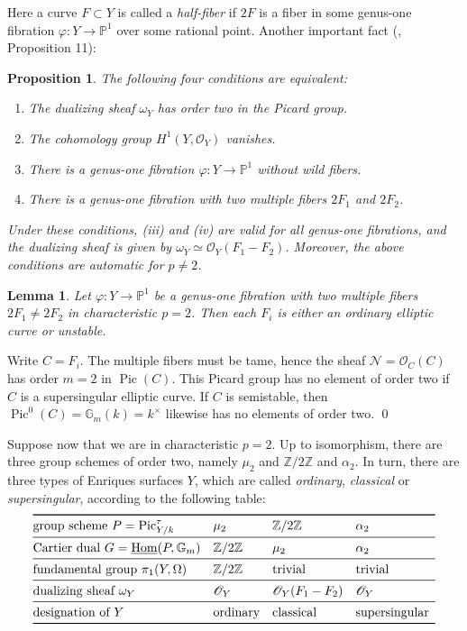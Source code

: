 \documentclass[oneside, 12pt]{amsart}
\newcommand\mylabel[1]{\label{#1}\marginpar{\vspace{-1ex}\medskip\medskip\footnotesize \tt #1}}
\renewcommand\mylabel[1]{\label{#1}}
\newtheorem{lemma}[theorem]{Lemma}
\newtheorem{proposition}[theorem]{Proposition}
\theoremstyle{definition}
\theoremstyle{remark}
\newcommand{\ZZ}{\mathbb{Z}}
\newcommand{\PP}{\mathbb{P}}
\newcommand{\GG}{\mathbb{G}}
\newcommand{\shN}{\mathscr{N}}
\renewcommand{\O}{\mathscr{O}}
\newcommand{\Pic}{\operatorname{Pic}}
\newcommand{\ra}{\rightarrow}
\newcommand{\uHom}{\underline{\operatorname{Hom}}}
\begin{document}
Here a curve $F\subset Y$ is called a \emph{half-fiber} if $2F$ is a fiber in some
genus-one fibration $\varphi:Y\ra\PP^1$ over some rational point.
Another important fact (\cite{Bombieri; Mumford 1977},  Proposition 11):

\begin{proposition}
\mylabel{omega order two}
The following four conditions are equivalent:
\begin{enumerate}
\item The dualizing sheaf $\omega_Y$ has order two in the Picard group.
\item The cohomology group $H^1(Y,\O_Y)$ vanishes.
\item There is a genus-one fibration $\varphi:Y\ra\PP^1$ without wild fibers.
\item There is a genus-one fibration with two multiple fibers $2F_1$ and $2F_2$.
\end{enumerate}
Under these conditions,   (iii) and (iv) are valid for all genus-one fibrations, and the dualizing sheaf
is given by $\omega_Y\simeq\O_Y(F_1-F_2)$. Moreover, the above conditions are automatic for $p\neq 2$.
\end{proposition}


\begin{lemma}
\mylabel{multiple for p=2}
Let $\varphi:Y\ra\PP^1$ be a genus-one fibration with two multiple fibers $2F_1\neq 2F_2$
in characteristic $p=2$. Then each $ F_i$ is either an ordinary elliptic curve  or unstable.
\end{lemma}

\proof
Write $C=F_i$.
The   multiple fibers   must be tame, hence the   sheaf $\shN=\O_C(C)$ has order $m=2$ in
 $\Pic(C)$. This Picard group has no element of order two if $C$ is a supersingular elliptic curve.
If $C$ is semistable, then $\Pic^0(C)=\GG_m(k)=k^\times $ likewise has no elements of order two. 
\qed
 
\medskip
Suppose now that we are in characteristic $p=2$. Up to isomorphism, there are three group schemes of order two,
namely $\mu_2$ and $\ZZ/2\ZZ$ and $\alpha_2$. In turn, there are three types of Enriques surfaces $Y$, which are called
\emph{ordinary}, \emph{classical} or \emph{supersingular}, according to the following table:
$$
\begin{array}[c]{@{}lll l}
\toprule	
\text{\rm group scheme $P=\Pic^\tau_{Y/k}$}		& \mu_2					& \ZZ/2\ZZ					& \alpha_2\\
\midrule
\text{\rm Cartier dual $G=\uHom(P,\GG_m)$}		& \ZZ/2\ZZ				& \mu_2						& \alpha_2\\
\midrule
\text{\rm fundamental group $\pi_1(Y,\Omega)$}	& \ZZ/2\ZZ				& {\rm trivial}				& {\rm trivial}	\\
\midrule
\text{\rm dualizing sheaf $\omega_Y$}			& \O_Y					& \O_Y(F_1-F_2) 			& \O_Y\\
\midrule
\text{designation of $Y$}						& \text{\rm ordinary}	& \text{\rm classical} 	& \text{\rm supersingular}\\
\bottomrule
\end{array}
$$
\end{document}
